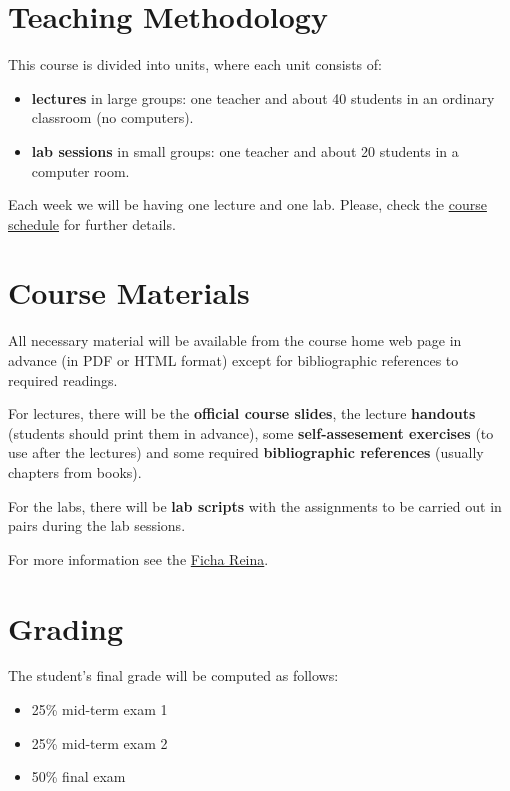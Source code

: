 \documentclass[11pt, a4paper, twoside]{article}
\begin{document}
\section{Teaching Methodology}

This course is divided into units, where each unit consists of:

\begin{itemize}

  \item \textbf{lectures} in large groups: one teacher and about 40 students in
    an ordinary classroom (no computers).

  \item \textbf{lab sessions} in small groups: one teacher and about 20
    students in a computer room.

\end{itemize}

Each week we will be having one lecture and one lab. Please, check the
\href{http://www.it.uc3m.es/alcortes/asig/1415/ps-ging/schedule.pdf}{course
schedule} for further details.

\section{Course Materials}

All necessary material will be available from the course home web page in
advance (in PDF or HTML format) except for bibliographic references to required
readings.

For lectures, there will be the \textbf{official course slides}, the lecture
\textbf{handouts} (students should print them in advance), some
\textbf{self-assesement exercises} (to use after the lectures) and some
required \textbf{bibliographic references} (usually chapters from books).

For the labs, there will be \textbf{lab scripts} with the assignments to be
carried out in pairs during the lab sessions.

For more information see the
\href{https://www3.uc3m.es/reina/titulaciones.html}{Ficha Reina}.

\section{Grading}

The student's final grade will be computed as follows:

\begin{itemize}

  \item 25\% mid-term exam 1

  \item 25\% mid-term exam 2

  \item 50\% final exam

\end{itemize}
\end{document}

